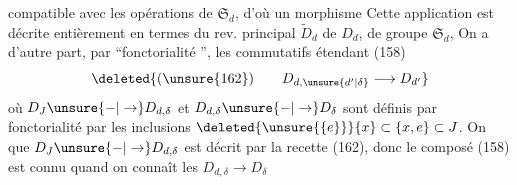compatible avec les opérations de $\mathfrak S_d$, d'où un morphisme
 Cette application est décrite entièrement en termes du rev. principal $\widetilde D_d$ de $D_d$, de groupe $\mathfrak S_d$,  On a d'autre part, par ``fonctorialité '', les  commutatifs étendant (158)
\[
\deleted{(\unsure{162})\qquad D_{d,\unsure{d'|\delta}}\longrightarrow D_{d'}}
\]
où $D_J\unsure{-|\to}D_{d,\delta}$ et $D_{d,\delta}\unsure{-|\to}D_\delta$ sont définis par fonctorialité par les inclusions $\deleted{\unsure{\{e\}}}\{x\}\subset\{x,e\}\subset J$. On  que $D_J\unsure{-|\to}D_{d,\delta}$ est décrit par la recette (162), donc le composé (158) est connu quand on connaît les $D_{d,\delta}\longrightarrow D_\delta$
